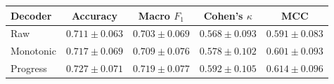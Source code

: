 \begin{tabular}{lcccc}
\toprule
Decoder & Accuracy & Macro $F_1$ & Cohen's $\kappa$ & MCC \\
\midrule
Raw & $0.711 \pm 0.063$ & $0.703 \pm 0.069$ & $0.568 \pm 0.093$ & $0.591 \pm 0.083$ \\
Monotonic & $0.717 \pm 0.069$ & $0.709 \pm 0.076$ & $0.578 \pm 0.102$ & $0.601 \pm 0.093$ \\
Progress & $0.727 \pm 0.071$ & $0.719 \pm 0.077$ & $0.592 \pm 0.105$ & $0.614 \pm 0.096$ \\
\bottomrule
\end{tabular}